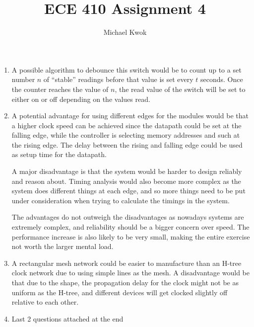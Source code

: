 \documentclass{article}
\title{ECE 410 Assignment 4}
\author{Michael Kwok}
\begin{document}
\maketitle

\begin{enumerate}
  \item A possible algorithm to debounce this switch would be to count up to a set number \(n\) of ``stable'' readings before that value is set every \(t\) seconds. Once the counter reaches the value of \(n\), the read value of the switch will be set to either on or off depending on the values read.

  \item A potential advantage for using different edges for the modules would be that a higher clock speed can be achieved since the datapath could be set at the falling edge, while the controller is selecting memory addresses and such at the rising edge. The delay between the rising and falling edge could be used as setup time for the datapath.

        A major disadvantage is that the system would be harder to design reliably and reason about. Timing analysis would also become more complex as the system does different things at each edge, and so more things need to be put under consideration when trying to calculate the timings in the system.

        The advantages do not outweigh the disadvantages as nowadays systems are extremely complex, and reliability should be a bigger concern over speed. The performance increase is also likely to be very small, making the entire exercise not worth the larger mental load.

  \item A rectangular mesh network could be easier to manufacture than an H-tree clock network due to using simple lines as the mesh. A disadvantage would be that due to the shape, the propagation delay for the clock might not be as uniform as the H-tree, and different devices will get clocked slightly off relative to each other.

  \item Last 2 questions attached at the end
\end{enumerate}


\end{document}
